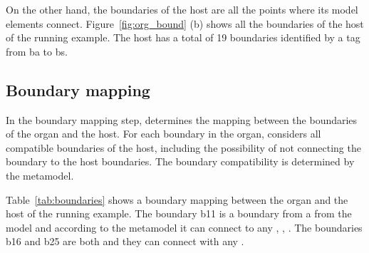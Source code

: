 On the other hand, the boundaries of the host are all the points where its model elements connect. Figure~\ref{fig:org_bound} (b) shows all the boundaries of the host of the running example. The host has a total of 19 boundaries identified by a tag from ba to bs.


\subsection{Boundary mapping}

In the boundary mapping step, \ApproachName{} determines the mapping between the boundaries of the organ and the host. For each boundary in the organ, \ApproachName{} considers all compatible boundaries of the host, including the possibility of not connecting the boundary to the host boundaries. The boundary compatibility is determined by the metamodel.

Table~\ref{tab:boundaries} shows a boundary mapping between the organ and the host of the running example. The boundary b11 is a boundary from a  from the model and according to the metamodel it can connect to any , , . The boundaries b16 and b25 are both  and they can connect with any .

